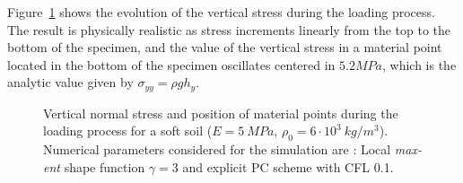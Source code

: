 \documentclass[preprint,12pt,a4paper]{elsarticle}
\begin{document}
Figure~\ref{fig:Block-LME3} shows the evolution of the vertical stress
during the loading process. The result is physically realistic as
stress increments linearly from the top to the bottom of the specimen,
and the value of the vertical stress in a material point located in
the bottom of the specimen oscillates centered in $5.2 MPa$, which is
the analytic value given by $\sigma_{yy} = \rho g h_y$.
\begin{figure}
  \centering
  \caption{Vertical normal stress and position of material points
    during the loading process for a soft soil ($E = 5\ MPa$, $\rho_0
    = 6\cdot 10^3\ kg/m^3$). Numerical parameters considered for the
    simulation are : Local \textit{max-ent} shape function $\gamma =3$
    and explicit PC scheme with CFL 0.1.}
  \label{fig:Block-LME3}
\end{figure}
\end{document}
